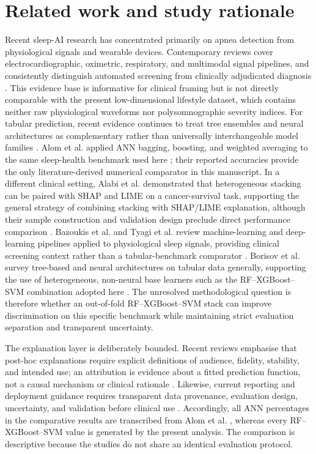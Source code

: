 \documentclass{elektr}
\begin{document}
\section{Related work and study rationale}
Recent sleep-AI research has concentrated primarily on apnea detection from physiological signals and wearable devices. Contemporary reviews cover electrocardiographic, oximetric, respiratory, and multimodal signal pipelines, and consistently distinguish automated screening from clinically adjudicated diagnosis \cite{bazoukis2023,tyagi2023,abdalrazaq2024,giorgi2025}. This evidence base is informative for clinical framing but is not directly comparable with the present low-dimensional lifestyle dataset, which contains neither raw physiological waveforms nor polysomnographic severity indices.
For tabular prediction, recent evidence continues to treat tree ensembles and neural architectures as complementary rather than universally interchangeable model families \cite{borisov2024}. Alom et al. applied ANN bagging, boosting, and weighted averaging to the same sleep-health benchmark used here \cite{alom2024}; their reported accuracies provide the only literature-derived numerical comparator in this manuscript. In a different clinical setting, Alabi et al. demonstrated that heterogeneous stacking can be paired with SHAP and LIME on a cancer-survival task, supporting the general strategy of combining stacking with SHAP/LIME explanation, although their sample construction and validation design preclude direct performance comparison \cite{alabi2023}. Bazoukis et al. and Tyagi et al. review machine-learning and deep-learning pipelines applied to physiological sleep signals, providing clinical screening context rather than a tabular-benchmark comparator \cite{bazoukis2023,tyagi2023}. Borisov et al. survey tree-based and neural architectures on tabular data generally, supporting the use of heterogeneous, non-neural base learners such as the RF--XGBoost--SVM combination adopted here \cite{borisov2024}. The unresolved methodological question is therefore whether an out-of-fold RF--XGBoost--SVM stack can improve discrimination on this specific benchmark while maintaining strict evaluation separation and transparent uncertainty.

The explanation layer is deliberately bounded. Recent reviews emphasise that post-hoc explanations require explicit definitions of audience, fidelity, stability, and intended use; an attribution is evidence about a fitted prediction function, not a causal mechanism or clinical rationale \cite{jung2023,allen2024}. Likewise, current reporting and deployment guidance requires transparent data provenance, evaluation design, uncertainty, and validation before clinical use \cite{tripodai2024,futureai2025}. Accordingly, all ANN percentages in the comparative results are transcribed from Alom et al. \cite{alom2024}, whereas every RF--XGBoost--SVM value is generated by the present analysis. The comparison is descriptive because the studies do not share an identical evaluation protocol.
\end{document}
